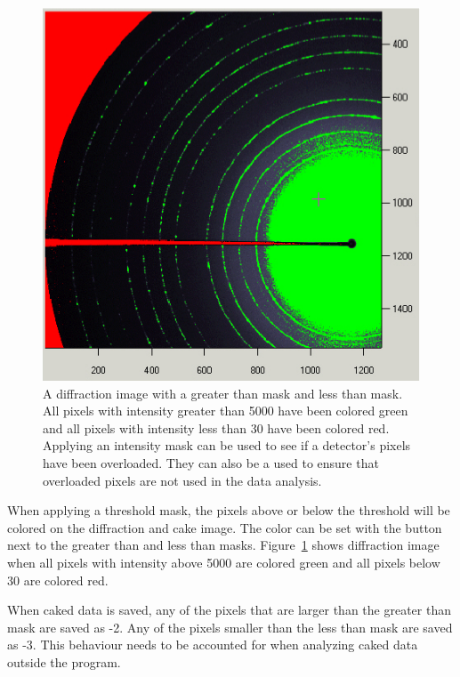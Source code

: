 \begin{figure}
    \centering
    \includegraphics[scale=.75]{figures/Threshold_Masking.eps}
    \caption{A diffraction image with a
    greater than mask and less than mask.
    All pixels with intensity greater than 5000 
    have been colored green and all pixels with 
    intensity less than 30 have been colored red. Applying
    an intensity mask can be used to see if a detector's
    pixels have been overloaded. They can also be a used to
    ensure that overloaded pixels are not used in the
    data analysis.}
    \label{Threshold_Masking}
\end{figure}

When applying a threshold mask, the pixels above or below
the threshold 
will be colored on the diffraction and cake image. 
The color can be set with the  button next to the greater 
than and less than masks. Figure~\ref{Threshold_Masking} shows 
diffraction image when all pixels
with intensity above 5000 are colored green and all pixels 
below 30 are colored red.

When caked data is saved, any of the pixels 
that are larger than the greater than mask are saved 
as -2. Any of the pixels smaller than the less than mask
are saved as -3. This behaviour needs to be accounted for
when analyzing caked data outside the program.

